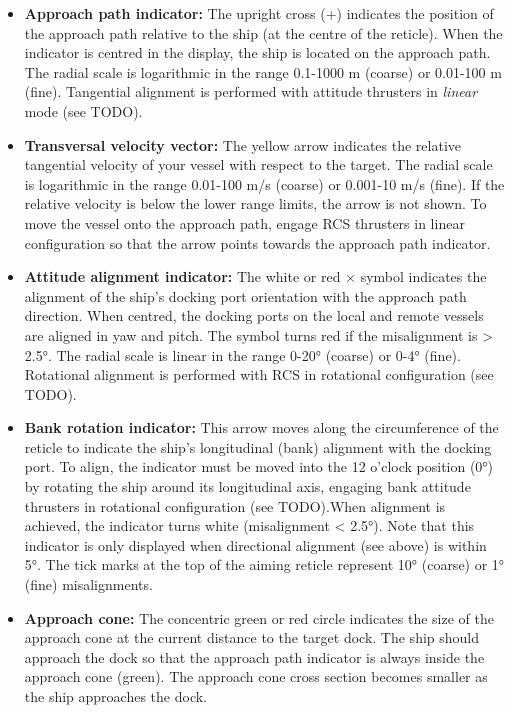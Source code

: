 \documentclass[Orbiter User Manual.tex]{subfiles}
\begin{document}
\begin{itemize}
\item \textbf{Approach path indicator:} The upright cross (+) indicates the position of the approach path relative to the ship (at the centre of the reticle). When the indicator is centred in the display, the ship is located on the approach path. The radial scale is logarithmic in the range 0.1-1000 m (coarse) or 0.01-100 m (fine). Tangential alignment is performed with attitude thrusters in \textit{linear} mode (see TODO).
\item \textbf{Transversal velocity vector:} The yellow arrow indicates the relative tangential velocity of your vessel with respect to the target. The radial scale is logarithmic in the range 0.01-100 m/s (coarse) or 0.001-10 m/s (fine). If the relative velocity is below the lower range limits, the arrow is not shown. To move the vessel onto the approach path, engage RCS thrusters in linear configuration so that the arrow points towards the approach path indicator.
\item \textbf{Attitude alignment indicator:} The white or red $\times$ symbol indicates the alignment of the ship's docking port orientation with the approach path direction. When centred, the docking ports on the local and remote vessels are aligned in yaw and pitch. The symbol turns red if the misalignment is > 2.5°. The radial scale is linear in the range 0-20° (coarse) or 0-4° (fine). Rotational alignment is performed with RCS in rotational configuration (see TODO).
\item \textbf{Bank rotation indicator:} This arrow moves along the circumference of the reticle to indicate the ship's longitudinal (bank) alignment with the docking port. To align, the indicator must be moved into the 12 o'clock position (0°) by rotating the ship around its longitudinal axis, engaging bank attitude thrusters in rotational configuration (see TODO).When alignment is achieved, the indicator turns white (misalignment < 2.5°). Note that this indicator is only displayed when directional alignment (see above) is within 5°. The tick marks at the top of the aiming reticle represent 10° (coarse) or 1° (fine) misalignments.
\item \textbf{Approach cone:} The concentric green or red circle indicates the size of the approach cone at the current distance to the target dock. The ship should approach the dock so that the approach path indicator is always inside the approach cone (green). The approach cone cross section becomes smaller as the ship approaches the dock.
\end{itemize}
\end{document}
